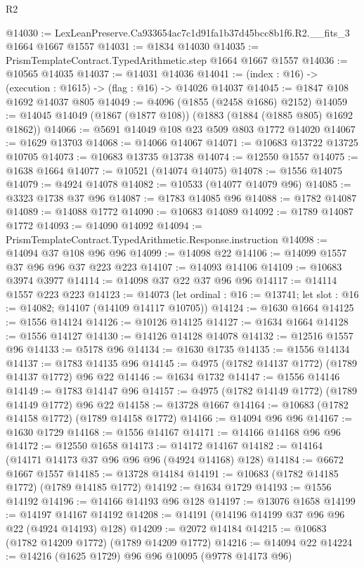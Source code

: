 \begin{lexlean}{R2}
\begin{coremodule}
@14030 := LexLeanPreserve.Ca933654ac7c1d91fa1b37d45bcc8b1f6.R2.__fits_3 @1664 @1667 @1557
@14031 := @1834 @14030
@14035 := PrismTemplateContract.TypedArithmetic.step @1664 @1667 @1557
@14036 := @10565 @14035
@14037 := @14031 @14036
@14041 := (index : @16) -> (execution : @1615) -> (flag : @16) -> @14026 @14037
@14045 := @1847 @108 @1692 @14037 @805
@14049 := @4096 (@1855 (@2458 @1686) @2152)
@14059 := @14045 @14049 (@1867 (@1877 @108)) (@1883 (@1884 (@1885 @805) @1692 @1862))
@14066 := @5691 @14049 @108 @23 @509 @803 @1772 @14020
@14067 := @1629 @13703
@14068 := @14066 @14067
@14071 := @10683 @13722 @13725 @10705
@14073 := @10683 @13735 @13738
@14074 := @12550 @1557
@14075 := @1638 @1664
@14077 := @10521 (@14074 @14075)
@14078 := @1556 @14075
@14079 := @4924 @14078
@14082 := @10533 (@14077 @14079 @96)
@14085 := @3323 @1738 @37 @96
@14087 := @1783 @14085 @96
@14088 := @1782 @14087
@14089 := @14088 @1772
@14090 := @10683 @14089
@14092 := @1789 @14087 @1772
@14093 := @14090 @14092
@14094 := PrismTemplateContract.TypedArithmetic.Response.instruction
@14098 := @14094 @37 @108 @96 @96
@14099 := @14098 @22
@14106 := @14099 @1557 @37 @96 @96 @37 @223 @223
@14107 := @14093 @14106
@14109 := @10683 @3974 @3977
@14114 := @14098 @37 @22 @37 @96 @96
@14117 := @14114 @1557 @223 @223
@14123 := @14073
    (let ordinal : @16 := @13741; let slot : @16 := @14082; @14107 (@14109 @14117 @10705))
@14124 := @1630 @1664
@14125 := @1556 @14124
@14126 := @10126 @14125
@14127 := @1634 @1664
@14128 := @1556 @14127
@14130 := @14126 @14128 @14078
@14132 := @12516 @1557 @96
@14133 := @5178 @96
@14134 := @1630 @1735
@14135 := @1556 @14134
@14137 := @1783 @14135 @96
@14145 := @4975 (@1782 @14137 @1772) (@1789 @14137 @1772) @96 @22
@14146 := @1634 @1732
@14147 := @1556 @14146
@14149 := @1783 @14147 @96
@14157 := @4975 (@1782 @14149 @1772) (@1789 @14149 @1772) @96 @22
@14158 := @13728 @1667
@14164 := @10683 (@1782 @14158 @1772) (@1789 @14158 @1772)
@14166 := @14094 @96 @96
@14167 := @1630 @1729
@14168 := @1556 @14167
@14171 := @14166 @14168 @96 @96
@14172 := @12550 @1658
@14173 := @14172 @14167
@14182 := @14164 (@14171 @14173 @37 @96 @96 @96 (@4924 @14168) @128)
@14184 := @6672 @1667 @1557
@14185 := @13728 @14184
@14191 := @10683 (@1782 @14185 @1772) (@1789 @14185 @1772)
@14192 := @1634 @1729
@14193 := @1556 @14192
@14196 := @14166 @14193 @96 @128
@14197 := @13076 @1658
@14199 := @14197 @14167 @14192
@14208 := @14191 (@14196 @14199 @37 @96 @96 @22 (@4924 @14193) @128)
@14209 := @2072 @14184
@14215 := @10683 (@1782 @14209 @1772) (@1789 @14209 @1772)
@14216 := @14094 @22
@14224 := @14216 (@1625 @1729) @96 @96 @10095 (@9778 @14173 @96)

\end{coremodule}
\end{lexlean}
